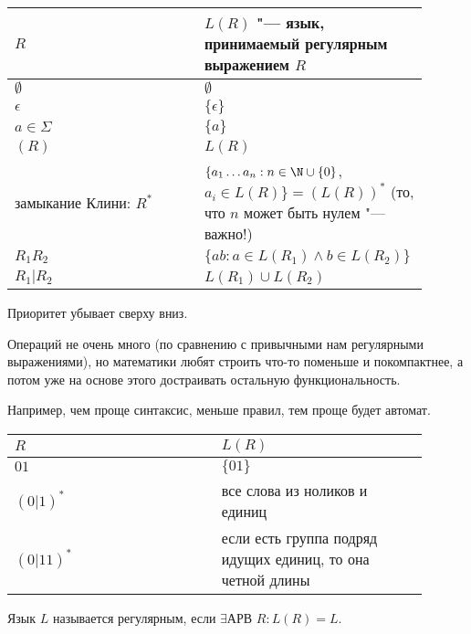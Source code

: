 \begin{tabular}{p{0.45\linewidth}|p{0.45\linewidth}}
$R$ & $L(R)$ "--- язык, принимаемый регулярным выражением $R$ \\
\hline
$\emptyset$ & $\emptyset$ \\
$\epsilon$ & $\{\epsilon\}$ \\
$a \in \Sigma$ & $\{a\}$ \\
$(R)$ & $L(R)$ \\
замыкание Клини: $R^*$ & $\{a_1 \dots a_n: n \in \N \cup \{0\}$, $a_i \in L(R)\} = (L(R))^*$ (то, что $n$ может быть нулем "--- важно!) \\
$R_1R_2$ & $\{ab: a \in L(R_1) \land b \in L(R_2)\}$ \\
$R_1 | R_2$ & $L(R_1) \cup L(R_2)$
\end{tabular}

Приоритет убывает сверху вниз.

\begin{Rem}
Операций не очень много (по сравнению с привычными нам регулярными выражениями), но математики любят строить что-то поменьше и покомпактнее, а потом уже на основе этого достраивать остальную функциональность.

Например, чем проще синтаксис, меньше правил, тем проще будет автомат.
\end{Rem}

\begin{exmp} 
\begin{tabular}{p{0.45\linewidth} | p{0.45\linewidth}}
$R$ & $L(R)$ \\
\hline
$01$ & $\{01\}$ \\
$(0|1)^*$ & все слова из ноликов и единиц \\
$(0|11)^*$ & если есть группа подряд идущих единиц, то она четной длины
\end{tabular}
\end{exmp}

\begin{Def}
Язык $L$ называется регулярным, если $\exists \text{АРВ } R: L(R) = L$.
\end{Def}